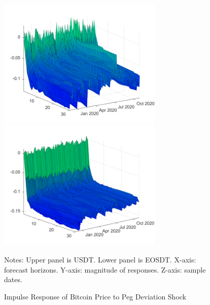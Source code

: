 \documentclass[12pt]{article}
\begin{document}
\begin{figure}
	\centering
	\caption{Impulse Response of Bitcoin Price to Peg Deviation Shock}
	\includegraphics[width=0.7\textwidth]{shock3resp2cum}
	\includegraphics[width=0.7\textwidth]{shock3resp2cumeos}
	\label{shock32}
	\begin{minipage}{1\textwidth} 
		{\footnotesize Notes: Upper panel is USDT. Lower panel is EOSDT. X-axis: forecast horizons. Y-axis: magnitude of responses. Z-axis: sample dates. \par}
	\end{minipage}
\end{figure}
\end{document}
